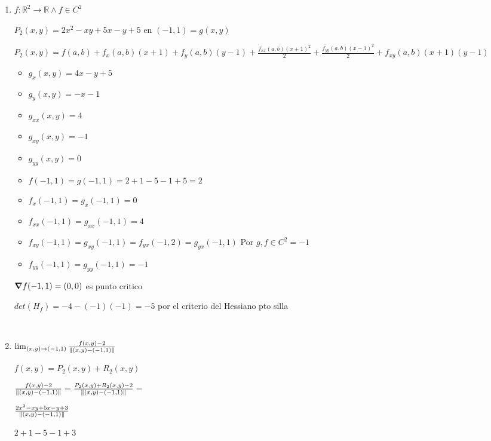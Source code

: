 \documentclass[../parcial.tex]{subfiles}
\begin{document}
    \begin{enumerate}
        \item $f:\mathbb{R}^2 \to \mathbb{R} \wedge f \in C^2$

            $P_2(x,y) = 2x^2 - xy + 5x - y + 5$ en $(-1,1) = g(x,y)$

            $P_2(x,y) = f(a,b) + f_x(a,b)(x+1) + f_y(a,b)(y-1) + \frac{f_{xx}(a,b)(x+1)^2}{2} + \frac{f_{yy}(a,b)(x-1)^2}{2} + f_{xy}(a,b)(x+1)(y-1)$

            \begin{itemize}
                \item $g_x(x,y) = 4x - y + 5 $
                \item $g_y(x,y) = -x - 1 $
                \item $g_{xx}(x,y) = 4 $
                \item $g_{xy}(x,y) = -1 $
                \item $g_{yy}(x,y) = 0 $
            \end{itemize}

            \begin{itemize}
                \item $f(-1,1) = g(-1,1) = 2 + 1 - 5 - 1 + 5 = 2$
                \item $f_x(-1,1) = g_x(-1,1) = 0$
                \item $f_{xx}(-1,1) = g_{xx}(-1,1) = 4$
                \item $f_{xy}(-1,1) = g_{xy}(-1,1) = f_{yx}(-1,2) = g_{yx}(-1,1)$ Por $g,f \in C^2 = -1$
                \item $f_{yy}(-1,1) = g_{yy}(-1,1) = -1 $
            \end{itemize}

            $\grad f(-1,1) = (0,0)$ es punto critico

            $ det(H_f) = -4 - (-1)(-1) = -5 $ por el criterio del Hessiano pto silla

            $  $

        \item $ \lim_{(x,y) \to (-1,1)} \frac{f(x,y)-2}{\norm*{(x,y)-(-1,1)}} $

        $ f(x,y) = P_2(x,y) + R_2(x,y) $

        $\frac{f(x,y)-2}{\norm*{(x,y)-(-1,1)}} = \frac{P_2(x,y) + R_2(x,y) - 2}{\norm*{(x,y)-(-1,1)}} = $

        $ \frac{2x^2 - xy + 5x - y + 3}{\norm*{(x,y)-(-1,1)}}$

        $ 2 + 1 - 5 - 1 + 3 $

    \end{enumerate}
\end{document}
